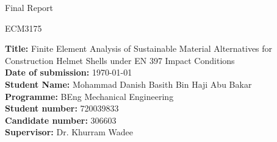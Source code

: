 \begin{titlepage}
    \centering
    \vspace*{2cm} %
    
    {\fontsize{30}{45}\selectfont Final Report\par}
    
    {\fontsize{20}{30}\selectfont ECM3175\par}
    
    \vspace{2.5cm} %
    \begin{flushleft}
    {\fontsize{18}{20.7}\selectfont
    \textbf{Title:} Finite Element Analysis of Sustainable Material Alternatives for Construction Helmet Shells under EN 397 Impact Conditions\\
    \vspace{1cm} %
    \textbf{Date of submission:} \today \\
    \vspace{1.5cm} %
    \textbf{Student Name:} Mohammad Danish Basith Bin Haji Abu Bakar\\
    \textbf{Programme:} BEng Mechanical Engineering\\
    \textbf{Student number:} 720039833\\
    \textbf{Candidate number:} 306603\\
    \vspace{1.5cm} %
    \textbf{Supervisor:} Dr. Khurram Wadee\par}
    \end{flushleft}
\end{titlepage}
